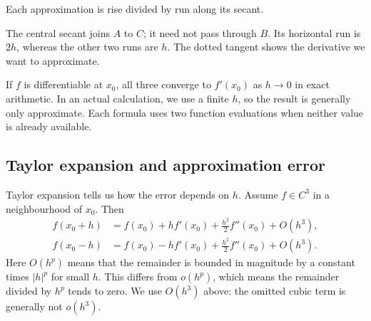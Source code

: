 \begin{center}

\small Each approximation is rise divided by run along its secant.
\end{center}
The central secant joins $A$ to $C$; it need not pass through $B$. Its horizontal run is $2h$, whereas the other two runs are $h$. The dotted tangent shows the derivative we want to approximate.

If $f$ is differentiable at $x_0$, all three converge to $f'(x_0)$ as $h\to0$ in exact arithmetic. In an actual calculation, we use a finite $h$, so the result is generally only approximate. Each formula uses two function evaluations when neither value is already available.

\subsection{Taylor expansion and approximation error}
Taylor expansion tells us how the error depends on $h$. Assume $f\in C^3$ in a neighbourhood of $x_0$. Then
\begin{align}
 f(x_0+h)&=f(x_0)+hf'(x_0)+\frac{h^2}{2}f''(x_0)+O(h^3),
 \label{eq:lec07-taylor-plus}\\
 f(x_0-h)&=f(x_0)-hf'(x_0)+\frac{h^2}{2}f''(x_0)+O(h^3).
 \label{eq:lec07-taylor-minus}
\end{align}
Here $O(h^p)$ means that the remainder is bounded in magnitude by a constant times $|h|^p$ for small $h$. This differs from $o(h^p)$, which means the remainder divided by $h^p$ tends to zero. We use $O(h^3)$ above: the omitted cubic term is generally not $o(h^3)$.

